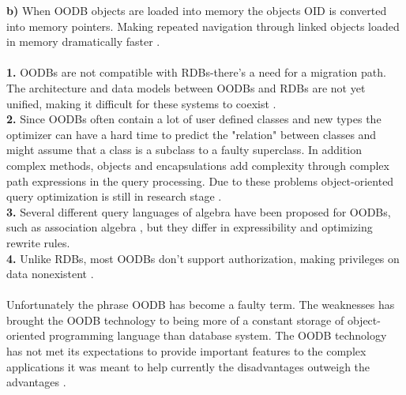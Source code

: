\documentclass{cslthse-msc}
\begin{document}
\textbf{b)} When OODB objects are loaded into memory the objects OID is converted into memory pointers. Making repeated navigation through linked objects loaded in memory dramatically faster \cite{userdefinedabstractions}.\\\\\textbf{1.} OODBs are not compatible with RDBs-there's a need for a migration path. The architecture and data models between OODBs and RDBs are not yet unified, making it difficult for these systems to coexist \cite{userdefinedabstractions}. \\\textbf{2.} Since OODBs often contain a lot of user defined classes and new types the optimizer can have a hard time to predict the "relation" between classes and might assume that a class is a subclass to a faulty superclass. In addition complex methods, objects and encapsulations add complexity through complex path expressions in the query processing. Due to these problems object-oriented query optimization is still in research stage \cite{OODBqopt}. \\\textbf{3.} Several different query languages of algebra have been proposed for OODBs, such as association algebra \cite{associationalg}, but they differ in expressibility and optimizing rewrite rules. \\\textbf{4.} Unlike RDBs, most OODBs don't support authorization, making privileges on data nonexistent \cite{userdefinedabstractions}.\\\\
Unfortunately the phrase OODB has become a faulty term. The weaknesses has brought the OODB technology to being more of a constant storage of object-oriented programming language than database system. The OODB technology has not met its expectations to provide important features to the complex applications it was meant to help currently the disadvantages outweigh the advantages \cite{OODBMS}.
\end{document}
